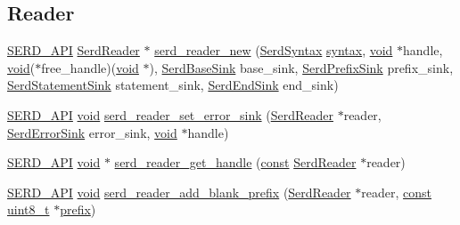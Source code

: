 \subsection*{Reader}
\begin{DoxyCompactItemize}
\item 
\hyperlink{serd_8h_a17b2ce3a34831e5e95018430d798bd66}{S\+E\+R\+D\+\_\+\+A\+PI} \hyperlink{group__serd_ga69c709eacb062f9e7777726ec80b2796}{Serd\+Reader} $\ast$ \hyperlink{group__serd_ga99a5f1ae546409bcb9a56d89e68902bf}{serd\+\_\+reader\+\_\+new} (\hyperlink{group__serd_ga42683406fcfa9046b28dd951cefd3391}{Serd\+Syntax} \hyperlink{cmdline_8c_a9aea52a77da0039230114dcf40c98aa6}{syntax}, \hyperlink{sound_8c_ae35f5844602719cf66324f4de2a658b3}{void} $\ast$handle, \hyperlink{sound_8c_ae35f5844602719cf66324f4de2a658b3}{void}($\ast$free\+\_\+handle)(\hyperlink{sound_8c_ae35f5844602719cf66324f4de2a658b3}{void} $\ast$), \hyperlink{group__serd_ga9f1652e78562130337b519f309dd5125}{Serd\+Base\+Sink} base\+\_\+sink, \hyperlink{group__serd_ga692f0bbdf5e2576191ee3556ecde7d55}{Serd\+Prefix\+Sink} prefix\+\_\+sink, \hyperlink{group__serd_ga9cd6dc709f738ed9770d0d2cd1195bd4}{Serd\+Statement\+Sink} statement\+\_\+sink, \hyperlink{group__serd_gae67888543462e4127e6a4f6af047026b}{Serd\+End\+Sink} end\+\_\+sink)
\item 
\hyperlink{serd_8h_a17b2ce3a34831e5e95018430d798bd66}{S\+E\+R\+D\+\_\+\+A\+PI} \hyperlink{sound_8c_ae35f5844602719cf66324f4de2a658b3}{void} \hyperlink{group__serd_ga3a64910235c2c8bedb0e9244b338c5c5}{serd\+\_\+reader\+\_\+set\+\_\+error\+\_\+sink} (\hyperlink{group__serd_ga69c709eacb062f9e7777726ec80b2796}{Serd\+Reader} $\ast$reader, \hyperlink{group__serd_ga925d2fda236697a3e643b307ffe242e5}{Serd\+Error\+Sink} error\+\_\+sink, \hyperlink{sound_8c_ae35f5844602719cf66324f4de2a658b3}{void} $\ast$handle)
\item 
\hyperlink{serd_8h_a17b2ce3a34831e5e95018430d798bd66}{S\+E\+R\+D\+\_\+\+A\+PI} \hyperlink{sound_8c_ae35f5844602719cf66324f4de2a658b3}{void} $\ast$ \hyperlink{group__serd_gaad5ac334bdf5d0c531dc0526c2310862}{serd\+\_\+reader\+\_\+get\+\_\+handle} (\hyperlink{getopt1_8c_a2c212835823e3c54a8ab6d95c652660e}{const} \hyperlink{group__serd_ga69c709eacb062f9e7777726ec80b2796}{Serd\+Reader} $\ast$reader)
\item 
\hyperlink{serd_8h_a17b2ce3a34831e5e95018430d798bd66}{S\+E\+R\+D\+\_\+\+A\+PI} \hyperlink{sound_8c_ae35f5844602719cf66324f4de2a658b3}{void} \hyperlink{group__serd_ga18b1d46abcd156310e0b18221aa80e31}{serd\+\_\+reader\+\_\+add\+\_\+blank\+\_\+prefix} (\hyperlink{group__serd_ga69c709eacb062f9e7777726ec80b2796}{Serd\+Reader} $\ast$reader, \hyperlink{getopt1_8c_a2c212835823e3c54a8ab6d95c652660e}{const} \hyperlink{lib-src_2ffmpeg_2win32_2stdint_8h_a9a941819355e6f658991890ff66b4b0e}{uint8\+\_\+t} $\ast$\hyperlink{structprefix}{prefix})

\end{DoxyCompactItemize}
